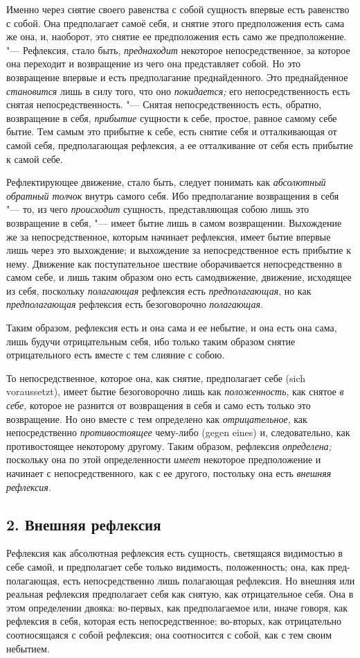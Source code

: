 Именно через снятие своего равенства с собой сущность впервые есть равенство
с собой. Она предполагает самоё себя, и снятие этого предположения есть
сама же она, и, наоборот, это снятие ее предположения есть само же
предположение. "--- Рефлексия, стало быть,
{\em преднаходит} некоторое непосредственное, за
которое она переходит и возвращение из чего она представляет собой. Но это
возвращение впервые и есть предполагание преднайденного. Это преднайденное
{\em становится} лишь в силу того, что оно
{\em покидается;} его непосредственность есть снятая
непосредственность. "--- Снятая непосредственность есть, обратно, возвращение
в себя, {\em прибытие} сущности к себе, простое, равное
самому себе бытие. Тем самым это прибытие к себе, есть снятие себя и
отталкивающая от самой себя, предполагающая рефлексия, а ее отталкивание от
себя есть прибытие к самой себе.

Рефлектирующее движение, стало быть, следует понимать как
{\em абсолютный обратный толчок} внутрь самого себя.
Ибо предполагание возвращения в себя "--- то, из чего
{\em происходит} сущность, представляющая собою лишь
это возвращение в себя, "--- имеет бытие лишь в самом возвращении. Выхождение
же за непосредственное, которым начинает рефлексия, имеет бытие впервые
лишь через это выхождение; и выхождение за непосредственное есть прибытие к
нему. Движение как поступательное шествие оборачивается непосредственно в
самом себе, и лишь таким образом оно есть самодвижение, движение, исходящее
из себя, поскольку {\em полагающая} рефлексия есть
{\em предполагающая}, но как
{\em предполагающая} рефлексия есть безоговорочно
{\em полагающая}.

Таким образом, рефлексия есть и она сама и ее небытие, и она есть она сама,
лишь будучи отрицательным себя, ибо только таким образом снятие
отрицательного есть вместе с тем слияние с собою.

То непосредственное, которое она, как снятие, предполагает себе (sich
voraussetzt), имеет бытие безоговорочно лишь как
{\em положенность}, как снятое
{\em в себе}, которое не разнится от возвращения в себя
и само есть только это возвращение. Но оно вместе с тем определено как
{\em отрицательное}, как непосредственно
{\em противостоящее} чему-либо (gegen eines) и,
следовательно, как противостоящее некоторому другому. Таким образом,
рефлексия {\em определена;} поскольку она по этой
определенности {\em имеет} некоторое предположение и
начинает с непосредственного, как с ее другого, постольку она есть
{\em внешняя рефлексия}.

\subsection[2. Внешняя рефлексия]{2. Внешняя рефлексия}
Рефлексия как абсолютная рефлексия есть
сущность, светящаяся видимостью в себе самой, и предполагает себе только
видимость, положенность; она, как пред-полагающая, есть непосредственно
лишь полагающая рефлексия. Но внешняя или реальная рефлексия предполагает
себя как снятую, как отрицательное себя. Она в этом определении двояка:
во-первых, как предполагаемое или, иначе говоря, как рефлексия в себя,
которая есть непосредственное; во-вторых, как отрицательно соотносящаяся с
собой рефлексия; она соотносится с собой, как с тем своим небытием.

